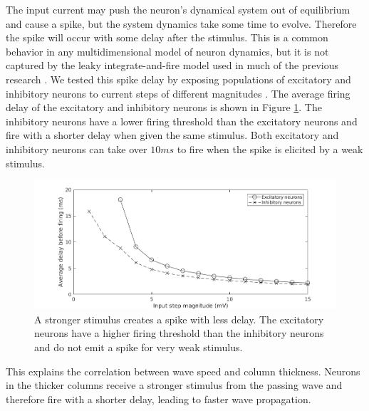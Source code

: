 \documentclass[a4paper,11pt]{article}
\begin{document}
The input current may push the neuron's dynamical system out of equilibrium and cause a spike, but the system dynamics take some time to evolve.
Therefore the spike will occur with some delay after the stimulus.
This is a common behavior in any multidimensional model of neuron dynamics, but it is not captured by the leaky integrate-and-fire model used in much of the previous research \cite{keane2015}\cite{senk2020}.
We tested this spike delay by exposing populations of excitatory and inhibitory neurons to current steps of different magnitudes \cite{izhikevich}.
The average firing delay of the excitatory and inhibitory neurons is shown in Figure \ref{fig:delay_neurondynamics}.
The inhibitory neurons have a lower firing threshold than the excitatory neurons and fire with a shorter delay when given the same stimulus.
Both excitatory and inhibitory neurons can take over $10ms$ to fire when the spike is elicited by a weak stimulus.
\begin{figure}[!htb]
 \caption{ A stronger stimulus creates a spike with less delay. The excitatory neurons have a higher firing threshold than the inhibitory neurons and do not emit a spike for very weak stimulus.}
 \label{fig:delay_neurondynamics}
 \centering
   \includegraphics[width=\textwidth]{fig/WaveSpeed_NeuronDynamics}
\end{figure}

This explains the correlation between wave speed and column thickness.
Neurons in the thicker columns receive a stronger stimulus from the passing wave and therefore fire with a shorter delay, leading to faster wave propagation.

\FloatBarrier
\end{document}

